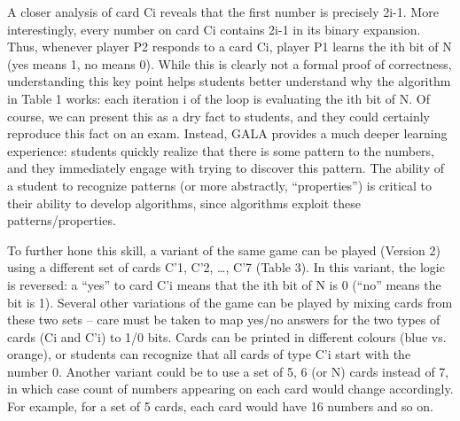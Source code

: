 \begin{multicols}{2}
A closer analysis of card Ci reveals that the first number is precisely 2i-1. More interestingly, every number on card Ci contains 2i-1 in its binary expansion. Thus, whenever player P2 responds to a card Ci, player P1 learns the ith bit of N (yes means 1, no means 0). While this is clearly not a formal proof of correctness, understanding this key point helps students better understand why the algorithm in Table 1 works: each iteration i of the loop is evaluating the ith bit of N. Of course, we can present this as a dry fact to students, and they could certainly reproduce this fact on an exam. Instead, GALA provides a much deeper learning experience: students quickly realize that there is some pattern to the numbers, and they immediately engage with trying to discover this pattern. The ability of a student to recognize patterns (or more abstractly, “properties”) is critical to their ability to develop algorithms, since algorithms exploit these patterns/properties.
 
To further hone this skill, a variant of the same game can be played (Version 2) using a different set of cards C’1, C’2, …, C’7 (Table 3). In this variant, the logic is reversed: a “yes” to card C’i means that the ith bit of N is 0 (“no” means the bit is 1). Several other variations of the game can be played by mixing cards from these two sets – care must be taken to map yes/no answers for the two types of cards (Ci and C’i) to 1/0 bits. Cards can be printed in different colours (blue vs. orange), or students can recognize that all cards of type C’i start with the number 0. Another variant could be to use a set of 5, 6 (or N) cards instead of 7, in which case count of numbers appearing on each card would change accordingly. For example, for a set of 5 cards, each card would have 16 numbers and so on. 
 
\end{multicols}



